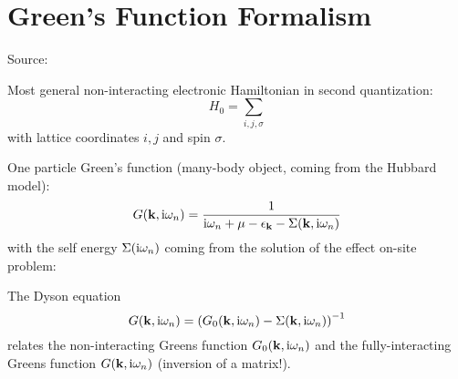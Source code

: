 \chapter{Green's Function Formalism}\label{ch:green's-function-formalism}

Source: \cite{Bruus_Flensberg_2004}

Most general non-interacting electronic Hamiltonian in second quantization:
\begin{equation}
    H_0 = \sum_{i, j, \sigma}
\end{equation}
with lattice coordinates \(i, j\) and spin \(\sigma\).



One particle Green's function (many-body object, coming from the Hubbard model):
\begin{equation}
    G(\mathbf{k}, \mathrm{i} \omega_n) = \frac{1}{\mathrm{i} \omega_n + \mu - \epsilon_{\mathbf{k}} - \Sigma(\mathbf{k}, \mathrm{i} \omega_n)}
\end{equation}
with the self energy \(\Sigma(\mathrm{i} \omega_n)\) coming from the solution of the effect on-site problem:

The Dyson equation
\begin{equation}
    G(\mathbf{k}, \mathrm{i} \omega_n) = \left( G_0 (\mathbf{k}, \mathrm{i} \omega_n) - \Sigma(\mathbf{k}, \mathrm{i} \omega_n)\right)^{-1}
\end{equation}
relates the non-interacting Greens function \(G_0 (\mathbf{k}, \mathrm{i} \omega_n)\) and the fully-interacting Greens function \(G (\mathbf{k}, \mathrm{i} \omega_n)\) (inversion of a matrix!).





